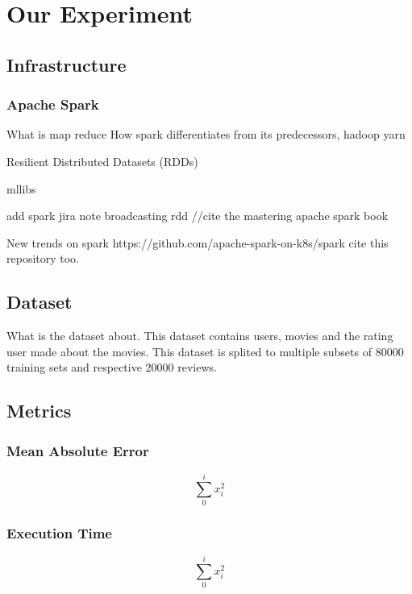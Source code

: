 \section{Our Experiment}
\subsection{Infrastructure}
\subsubsection{Apache Spark}
What is map reduce
How spark differentiates from its predecessors, hadoop yarn



Resilient Distributed Datasets (RDDs)

mllibs


add spark jira note
broadcasting rdd
//cite the mastering apache spark book

\cite{ApacheSpark:1}

New trends on spark https://github.com/apache-spark-on-k8s/spark cite this repository too.

\subsection{Dataset}
What is the dataset about. This dataset contains users, movies and the rating user made about the movies.
This dataset is splited to multiple subsets of 80000 training sets and respective 20000 reviews.
\cite{MovieLens:3}
\subsection{Metrics}
\subsubsection{Mean Absolute Error}
\begin{equation}
\sum_{0}^{i}x_{i}^{2}
\end{equation}
\subsubsection{Execution Time}
\begin{equation}
\sum_{0}^{i}x_{i}^{2}
\end{equation}